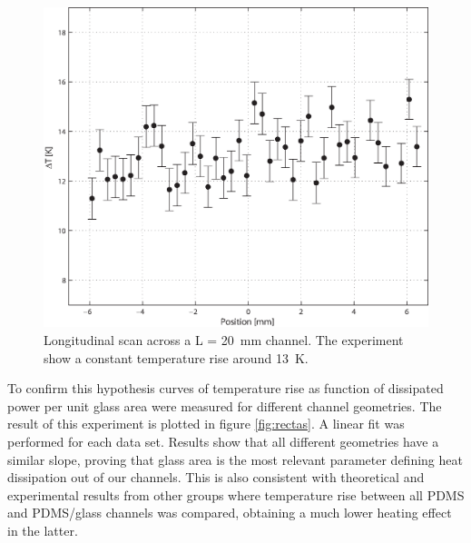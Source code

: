 \documentclass[twocolumn]{svjour3}       %
\begin{document}

\begin{figure}[h!]
\centering
\includegraphics[width=\columnwidth]{figs/long.eps}
\caption{Longitudinal scan across a L = 20~mm channel. The experiment show a constant temperature rise around 13~K.\label{fig:long}}
\end{figure}

To confirm this hypothesis curves of temperature rise as function of dissipated power per unit glass area were measured for different channel geometries. The result of this experiment is plotted in figure \ref{fig:rectas}. A linear fit was performed for each data set. Results show that all different geometries have a similar slope, proving that glass area is the most relevant parameter defining heat dissipation out of our channels. This is also consistent with theoretical and experimental results from other groups \cite{} where temperature rise between all PDMS and PDMS/glass channels was compared, obtaining a much lower heating effect in the latter. 
\end{document}
